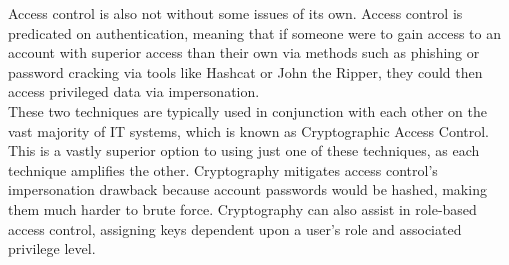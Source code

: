 \documentclass[12pt]{report}
\begin{document}
    \noindent Access control is also not without some issues of its own.
    Access control is predicated on authentication, meaning that if someone were to gain access to an account
    with superior access than their own via methods such as phishing or password cracking via tools like Hashcat or
    John the Ripper, they could then access privileged data via impersonation.\\

    \noindent These two techniques are typically used in conjunction with each other on the vast majority of
    IT systems, which is known as Cryptographic Access Control.
    This is a vastly superior option to using just one of these techniques, as each technique amplifies the other.
    Cryptography mitigates access control's impersonation drawback because account passwords would be hashed, making
    them much harder to brute force.
    Cryptography can also assist in role-based access control, assigning keys dependent upon a user's role and
    associated privilege level.
%
%

    \printbibliography
\end{document}
